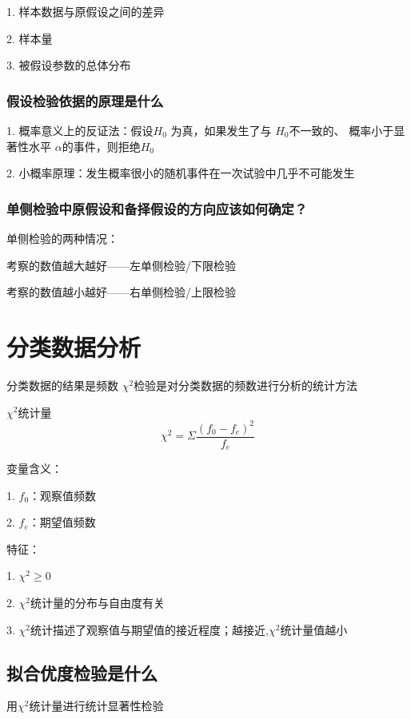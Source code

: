 \documentclass[UTF8,10pt]{book}
\begin{document}
{    1. 样本数据与原假设之间的差异 
    
    2. 样本量 

    3. 被假设参数的总体分布


    \subsection{假设检验依据的原理是什么}	
    1. 概率意义上的反证法：假设$ H_0 $ 为真，如果发生了与 $ H_0 $不一致的、
    概率小于显著性水平 $ \alpha $的事件，则拒绝$ H_0 $ 
    
    2. 小概率原理：发生概率很小的随机事件在一次试验中几乎不可能发生

    \subsection{单侧检验中原假设和备择假设的方向应该如何确定？}
    单侧检验的两种情况： 
    
    考察的数值越大越好——左单侧检验/下限检验 
    
    考察的数值越小越好——右单侧检验/上限检验
}






\clearpage







\chapter{分类数据分析}


分类数据的结果是频数 $\chi^2$检验是对分类数据的频数进行分析的统计方法		

$\chi^2$统计量	$$\chi^2 = \Sigma \frac{(f_0-f_e)^2}{f_e}$$ 

变量含义： 

1. $f_0$：观察值频数 

2. $f_e$：期望值频数 

特征： 

1. $\chi^2 \geq 0$ 

2. $\chi^2$统计量的分布与自由度有关 

3. $\chi^2$统计描述了观察值与期望值的接近程度；越接近,$\chi^2$统计量值越小	

\section{拟合优度检验是什么}	
用$\chi^2$统计量进行统计显著性检验 
\end{document}
